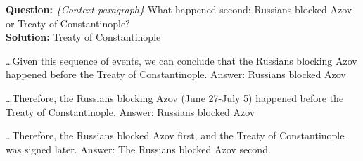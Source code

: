 \begin{tcolorbox}[colback=gray!6, colframe=gray!50, arc=2mm, boxrule=0.5pt]
    \small
    \textbf{Question:} \textit{\{Context paragraph\}} %
    What happened second: Russians blocked Azov or Treaty of Constantinople?\\
    \textbf{Solution:} Treaty of Constantinople

    \medskip

    \vspace{-0.1cm}
    \begin{tcolorbox}[
    colback=white, 
    title={Claude 3.5 Sonnet (June)},
    coltitle=black,
    colbacktitle=gray!25,
    colframe=gray!50,
    arc=2mm,
    boxrule=0.5pt,
    top=3pt,
    bottom=3pt]
    \ldots Given this sequence of events, we can conclude that the Russians blocking Azov happened before the Treaty of Constantinople.
    Answer: Russians blocked Azov
    \end{tcolorbox}
    \begin{tcolorbox}[
    colback=white, 
    title={Claude 3.5 Sonnet (October)},
    coltitle=black,
    colbacktitle=gray!25,
    colframe=gray!50,
    arc=2mm,
    boxrule=0.5pt,
    top=3pt,
    bottom=3pt]
    \ldots Therefore, the Russians blocking Azov (June 27-July 5) happened before the Treaty of Constantinople. Answer: Russians blocked Azov
    \end{tcolorbox}
    \begin{tcolorbox}[colback=white, 
    title={Mistral Small},
    coltitle=black,
    colbacktitle=gray!25,
    colframe=gray!50, arc=2mm, boxrule=0.5pt,
    top=3pt,
    bottom=3pt]
    \ldots Therefore, the Russians blocked Azov first, and the Treaty of Constantinople was signed later. Answer: The Russians blocked Azov second.
    \end{tcolorbox}
    

\end{tcolorbox}
